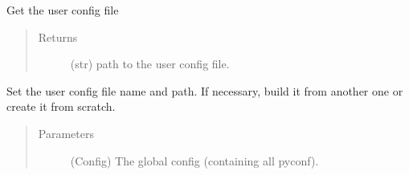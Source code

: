 \documentclass[a4paper,10pt,english]{sphinxmanual}
\begin{document}
\begin{fulllineitems}
\begin{fulllineitems}
\label{\detokenize{apidoc_src/src:src.configManager.ConfigManager.get_user_config_file}}
Get the user config file
\begin{quote}\begin{description}
\item[{Returns}] \leavevmode
(str) path to the user config file.

\end{description}\end{quote}

\end{fulllineitems}


\begin{fulllineitems}
\label{\detokenize{apidoc_src/src:src.configManager.ConfigManager.set_user_config_file}}
Set the user config file name and path.
If necessary, build it from another one or create it from scratch.
\begin{quote}\begin{description}
\item[{Parameters}] \leavevmode
{} \textendash{} (Config) 
The global config (containing all pyconf).

\end{description}\end{quote}

\end{fulllineitems}


\end{fulllineitems}

\end{document}
